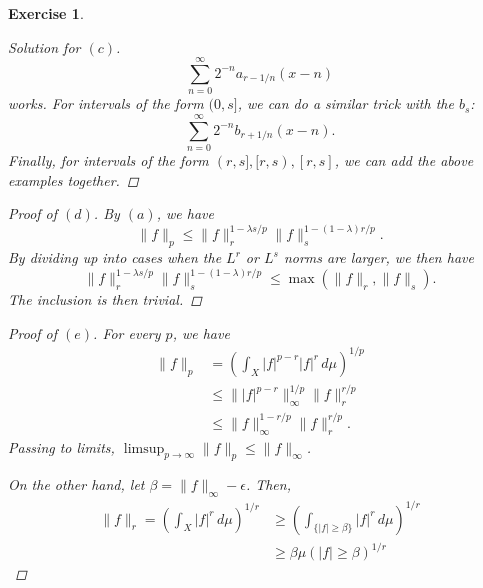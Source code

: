 \documentclass[10pt,letterpaper]{amsart}
\newtheorem{exercise}{Exercise}[section]
\theoremstyle{definition}
\theoremstyle{remark}
\numberwithin{equation}{exercise}
\begin{document}
\begin{multicols}{2}
\begin{exercise}
\begin{proof}[Solution for $(c)$]
      \begin{equation*}
        \sum_{n=0}^\infty 2^{-n} a_{r-1/n}(x-n)
      \end{equation*}
      works. For intervals of the form $(0,s]$, we can do a similar trick with
      the $b_s$:
      \begin{equation*}
        \sum_{n=0}^\infty 2^{-n} b_{r+1/n}(x-n).
      \end{equation*}
      Finally, for intervals of the form $(r,s],[r,s),[r,s]$, we can add the above
      examples together.
    \end{proof}
    \begin{proof}[Proof of $(d)$]
      By $(a)$, we have
      \begin{equation*}
        \lVert f \rVert_p \le \lVert f \rVert_r^{1 - \lambda s/p} \lVert f
        \rVert_s^{1 - (1-\lambda)r/p}.
      \end{equation*}
      By dividing up into cases when the $L^r$ or $L^s$ norms are larger, we
      then have
      \begin{equation*}
        \lVert f \rVert_r^{1 - \lambda s/p} \lVert f
        \rVert_s^{1 - (1-\lambda)r/p} \le \max(\lVert f \rVert_r,\lVert f
        \rVert_s).
      \end{equation*}
      The inclusion is then trivial.
    \end{proof}
    \begin{proof}[Proof of $(e)$]
      For every $p$, we have
      \begin{align*}
        \lVert f \rVert_p &= \left(\int_X \lvert f \rvert^{p-r}\lvert f
        \rvert^r\,d\mu\right)^{1/p}\\
        &\le \lVert \lvert f \rvert^{p-r} \rVert_\infty^{1/p} \lVert f
        \rVert_r^{r/p}\\
        &\le \lVert f \rVert_\infty^{1-r/p} \lVert f \rVert_r^{r/p}.
      \end{align*}
      Passing to limits, $\limsup_{p \to \infty} \lVert f \rVert_p
      \le \lVert f \rVert_\infty$.
      \par On the other hand, let $\beta = \lVert f \rVert_\infty - \epsilon$.
      Then,
      \begin{align*}
        \lVert f \rVert_r = \left( \int_X \lvert f \rvert^r\,d\mu
        \right)^{1/r}
        &\ge \left( \int_{\{\lvert f \rvert \ge \beta\}} \lvert f
        \rvert^r\,d\mu\right)^{1/r}\\
        &\ge \beta \mu(\lvert f \rvert \ge \beta)^{1/r}
      \end{align*}

\end{proof}
\end{exercise}
\end{multicols}
\end{document}
